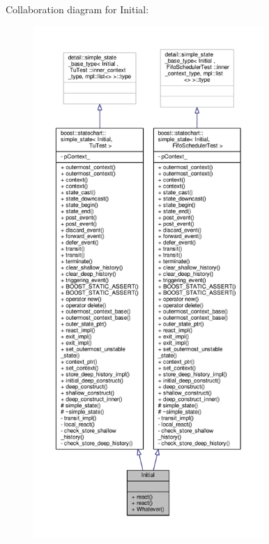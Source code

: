 Collaboration diagram for Initial\+:
\nopagebreak
\begin{figure}[H]
\begin{center}
\leavevmode
\includegraphics[height=550pt]{struct_initial__coll__graph}
\end{center}
\end{figure}
